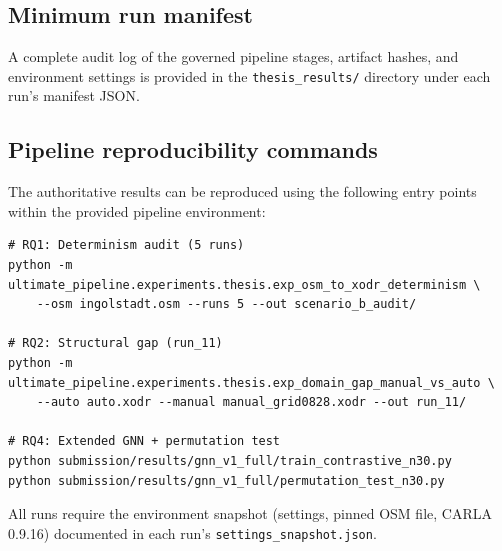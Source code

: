 \subsection{Minimum run manifest}
A complete audit log of the governed pipeline stages, artifact hashes, and environment settings is provided in the \texttt{thesis\_results/} directory under each run's manifest JSON.

\subsection{Pipeline reproducibility commands}
The authoritative results can be reproduced using the following entry points within the provided pipeline environment:

\begin{verbatim}
# RQ1: Determinism audit (5 runs)
python -m ultimate_pipeline.experiments.thesis.exp_osm_to_xodr_determinism \
    --osm ingolstadt.osm --runs 5 --out scenario_b_audit/

# RQ2: Structural gap (run_11)
python -m ultimate_pipeline.experiments.thesis.exp_domain_gap_manual_vs_auto \
    --auto auto.xodr --manual manual_grid0828.xodr --out run_11/

# RQ4: Extended GNN + permutation test
python submission/results/gnn_v1_full/train_contrastive_n30.py
python submission/results/gnn_v1_full/permutation_test_n30.py
\end{verbatim}

All runs require the environment snapshot (settings, pinned OSM file, CARLA 0.9.16) documented in each run's \texttt{settings\_snapshot.json}.


